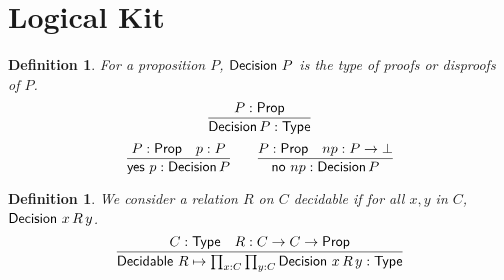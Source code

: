 \documentclass{amsart}
\newtheorem{definition}[theorem]{Definition}
\begin{document}
\newpage
\appendix
\section{Logical Kit}

\begin{definition}
  For a proposition $P$, $\mathsf{Decision}\ P$ is the type of proofs or
  disproofs of $P$.
  \[
    \infer{\ty{Decision}\, P : \ty{Type}}
    {
      P : \ty{Prop}
    }
  \]
  \[
    \infer{\con{yes}\ p : \ty{Decision}\, P}
    {
      P : \ty{Prop} &
      p : P
    }
    \qquad
    \infer{\con{no}\ np : \ty{Decision}\, P}
    {
      P : \ty{Prop} &
      np : P\to\ty\bot
    }
  \]
\end{definition}

\begin{definition}
  We consider a relation $R$ on $C$ decidable if for all $x,y$ in
  $C$, $\mathsf{Decision}\ x\,R\,y$.
  \[
    \infer{\ty{Decidable}\ R \mapsto \prod_{x:C}\prod_{y:C} \ty{Decision}\ x\,R\,y : \ty{Type}}
    {
      C : \ty{Type} &
      R : C\to C\to\ty{Prop}
    }
  \]

\end{definition}
\end{document}
